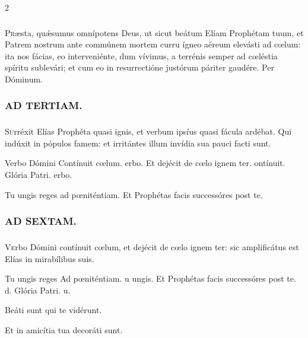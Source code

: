 \documentclass[9pt,twoside]{extarticle}
\begin{document}
\begin{multicols}{2}
\subsubsection*{\center {}}
\lettrine{P}ræsta, quǽsumus omnípotens Deus, ut sicut beátum Elíam Prophétam tuum, et Patrem nostrum ante commúnem mortem curru ígneo aéreum elevásti ad cœlum: ita nos fácias, eo interveniénte, dum vívimus, a terrénis semper ad cœléstia spíritu sublevári; et cum eo in resurrectióne justórum páriter gaudére. Per Dóminum.

\subsubsection*{\center \textsc{AD TERTIAM.}}
\subsubsection*{}
\lettrine{S}urréxit Elías Prophéta quasi ignis, et verbum ipsíus quasi fácula ardébat. Qui indúxit in pópulos famem: et irritántes illum invídia sua pauci facti sunt.

\begin{tightlist}{}
\item {} Verbo Dómini \textred{*} Contínuit cœlum. erbo.  Et dejécit de cœlo ignem ter. ontínuit. Glória Patri. erbo.
\item {} Tu ungis reges ad pœniténtiam.  Et Prophétas facis successóres post te.
\end{tightlist}

\subsubsection*{\center \textsc{AD SEXTAM.}}
\subsubsection*{}
\lettrine{V}erbo Dómini contínuit cœlum, et dejécit de cœlo ignem ter: sic amplificátus est Elías in mirabílibus suis.

\begin{tightlist}
\item {} Tu ungis reges \textred{*} Ad pœniténtiam. u ungis.  Et Prophétas facis successóres post te. d. Glória Patri. u.
\item {} Beáti sunt qui te vidérunt. 
\item {} Et in amicítia tua decoráti sunt.
\end{tightlist}


\end{multicols}
\end{document}
